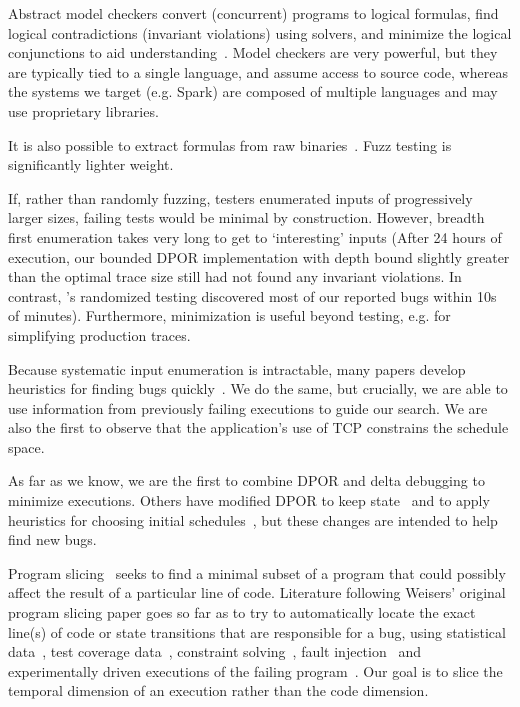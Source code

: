 Abstract model checkers convert (concurrent) programs to logical formulas, find
logical contradictions (invariant violations) using solvers, and minimize the logical
conjunctions to aid
understanding~\cite{christ2013flow,khoshnood2015concbugassist,machado2015concurrency}.
Model checkers are very powerful, but they are typically tied to a single
language, and assume access to source code, whereas the systems we target (e.g.
Spark) are composed of multiple languages and may use proprietary
libraries.

It is also possible to extract formulas from raw binaries~\cite{avgerinos2014enhancing}.
Fuzz testing is significantly lighter weight.

If, rather than randomly fuzzing, testers
enumerated inputs of progressively larger sizes, failing tests would
be minimal by construction. However, breadth first enumeration takes very long to get to
`interesting' inputs (After 24 hours of execution, our bounded DPOR
implementation with depth bound slightly greater than the optimal trace size still had not found any invariant violations. In
contrast, \sys's randomized testing discovered
most of our reported bugs within 10s of minutes).
Furthermore, minimization is
useful beyond testing, e.g. for simplifying production traces.

Because systematic input enumeration is intractable, many papers
develop heuristics for finding bugs
quickly~\cite{tzoref2007instrumenting,musuvathi2007iterative,musuvathi2008finding,yabandeh2009crystalball,burckhardt2010randomized,terragnirecontest,fonseca2014ski,leesatapornwongsa2014samc,lin2009modist,park2009ctrigger,coons2010gambit}.
We do the same, but crucially, we are able to use
information from previously failing executions to guide our search.
We are also the first to observe that the
application's use
of TCP constrains the schedule space.

As far as we know, we are the first to combine DPOR and delta debugging to
minimize executions. Others have modified DPOR to keep state~\cite{yang2008efficient,yi2006stateful}
and to apply heuristics for choosing initial schedules~\cite{lauterburg2010evaluating}, but these
changes are intended to help find new bugs.

 Program slicing~\cite{weiser1981program}
seeks to find a minimal subset of a program that could possibly affect the result of a particular line of code.
Literature following Weisers' original program
slicing paper goes so far as to try to
automatically locate the exact line(s) of code or state transitions that are responsible for a
bug, using statistical data~\cite{zhangzhang}, test coverage
data~\cite{coverage_localization,xuan14}, constraint solving~\cite{jose11},
fault injection~\cite{zhang13} and
experimentally driven executions of the failing program~\cite{zeller2005,comparative_causality}.
Our goal is to slice the temporal dimension of an execution rather than the
code dimension.

